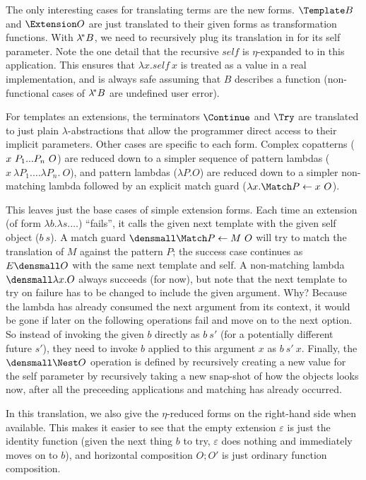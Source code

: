 The only interesting cases for translating terms are the new forms.
$\Template B$ and $\Extension O$ are just translated to their given forms as transformation functions.
With $\lambda^{\!*} B$, we need to recursively plug its translation in for its self parameter.
Note the one detail that the recursive $\mathit{self}$ is $\eta$-expanded to in this application.
This ensures that $\lambda x. \mathit{self} ~ x$ is treated as a value in a real implementation, and is always safe assuming that $B$ describes a function (non-functional cases of $\lambda^{\!*} B$ are undefined user error).

For templates an extensions, the terminators $\Continue$ and $\Try$ are translated to just plain $\lambda$-abstractions that allow the programmer direct access to their implicit parameters.
Other cases are specific to each form.
Complex copatterns ($x ~ P_1\overset{{}_{}}{...} P_n ~ O$) are reduced down to a simpler sequence of pattern lambdas ($x ~ \lambda P_1. \dots \lambda P_n. ~ O$), and pattern lambdas ($\lambda P. O$) are reduced down to a simpler non-matching lambda followed by an explicit match guard ($\lambda x. \Match P \gets x ~ O$).

This leaves just the base cases of simple extension forms.
Each time an extension (of form $\lambda b. \lambda s. \dots$) ``fails'', it calls the given next template with the given self object ($b~s$).
A match guard $\den{\Match P \gets M ~ O}$ will try to match the translation of $M$ against the pattern $P$; the success case continues as $E\den{O}$ with the same next template and self.
A non-matching lambda $\den{\lambda x. O}$ always succeeds (for now), but note that the next template to try on failure has to be changed to include the given argument.
Why?
Because the lambda has already consumed the next argument from its context, it would be gone if later on the following operations fail and move on to the next option.
So instead of invoking the given $b$ directly as $b~s'$ (for a potentially different future $s'$), they need to invoke $b$ applied to this argument $x$ as $b~s'~x$.
Finally, the $\den{\Nest O}$ operation is defined by recursively creating a new value for the self parameter by recursively taking a new snap-shot of how the objects looks now, after all the preceeding applications and matching has already occurred.

In this translation, we also give the $\eta$-reduced forms on the right-hand side when available.
This makes it easier to see that the empty extension $\varepsilon$ is just the identity function (given the next thing $b$ to try, $\varepsilon$ does nothing and immediately moves on to $b$), and horizontal composition $O; O'$ is just ordinary function composition.


